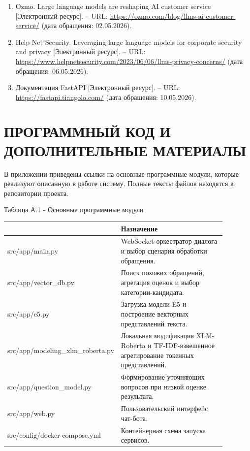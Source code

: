 \documentclass[14pt,a4paper]{extarticle}
\renewcommand{\textbf}[1]{#1}
\newcommand{\TableHead}[1]{{\centering\arraybackslash\bfseries #1\par}}
\newcommand{\AppendixSection}[2]{%
  \clearpage
  \section{#2}%
}
\numberwithin{figure}{section}
\numberwithin{table}{section}
\begin{document}
\begin{enumerate}
\item Ozmo. Large language models are reshaping AI customer service [Электронный ресурс]. -- URL: \url{https://ozmo.com/blog/llms-ai-customer-service/} (дата обращения: 02.05.2026).
\item Help Net Security. Leveraging large language models for corporate security and privacy [Электронный ресурс]. -- URL: \url{https://www.helpnetsecurity.com/2023/06/06/llms-privacy-concerns/} (дата обращения: 06.05.2026).
\item Документация FastAPI [Электронный ресурс]. -- URL: \url{https://fastapi.tiangolo.com/} (дата обращения: 10.05.2026).
\end{enumerate}
\endgroup

\clearpage
\appendix
\renewcommand{\thesection}{\Alph{section}}
\AppendixSection{A}{ПРОГРАММНЫЙ КОД И ДОПОЛНИТЕЛЬНЫЕ МАТЕРИАЛЫ}
\label{app:listings}

В приложении приведены ссылки на основные программные модули, которые реализуют описанную в работе систему. Полные тексты файлов находятся в репозитории проекта.

\textbf{Таблица А.1 - Основные программные модули}

\begin{longtable}{@{}|>{\raggedright\arraybackslash\footnotesize\ttfamily}p{0.40\linewidth}|>{\raggedright\arraybackslash}p{0.48\linewidth}|@{}}
\hline
{\normalfont\normalsize\TableHead{Файл}} & \TableHead{Назначение} \\ \hline
\endhead
src/app/main.py & WebSocket-оркестратор диалога и выбор сценария обработки обращения. \\ \hline
src/app/vector\_db.py & Поиск похожих обращений, агрегация оценок и выбор категории-кандидата. \\ \hline
src/app/e5.py & Загрузка модели E5 и построение векторных представлений текста. \\ \hline
src/app/modeling\_xlm\_roberta.py & Локальная модификация XLM-Roberta и TF-IDF-взвешенное агрегирование токенных представлений. \\ \hline
src/app/question\_model.py & Формирование уточняющих вопросов при низкой оценке результата. \\ \hline
src/app/web.py & Пользовательский интерфейс чат-бота. \\ \hline
src/config/docker-compose.yml & Контейнерная схема запуска сервисов. \\ \hline
\end{longtable}
\end{document}
